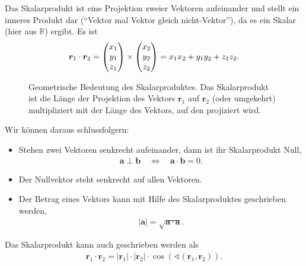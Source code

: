 Das Skalarprodukt ist eine Projektion zweier Vektoren aufeinander und stellt ein inneres Produkt dar (``Vektor mal Vektor gleich nicht-Vektor''), da es ein Skalar (hier aus $\mathbb{R}$) ergibt. Es ist 
\begin{align}
    \bm{r}_1 \cdot \bm{r}_2 = \mqty(x_1\\y_1\\z_1) \times \mqty(x_2\\y_2\\z_2) = x_1x_2 + y_1y_2+z_1z_2.
\end{align}
\begin{figure}[htp]
    \centering
    \caption{Geometrische Bedeutung des Skalarproduktes. Das Skalarprodukt ist die Länge der Projektion des Vektors $\bm{r}_1$ auf $\bm{r}_2$ (oder umgekehrt) multipliziert mit der Länge des Vektors, auf den projiziert wird.}
\end{figure}
Wir können daraus schlussfolgern: 
\begin{itemize}
    \item Stehen zwei Vektoren senkrecht aufeinander, dann ist ihr Skalarprodukt Null, 
    \begin{align}
        \bm{a} \perp \bm{b} \quad \Longleftrightarrow \quad \bm{a}\cdot \bm{b} = 0. 
    \end{align}
    \item Der Nullvektor steht senkrecht auf allen Vektoren. 
    \item Der Betrag eines Vektors kann mit Hilfe des Skalarproduktes geschrieben werden, 
    \begin{align}
        |\bm{a}| = \sqrt{\bm{a}\cdot\bm{a}}.
    \end{align}
\end{itemize}
Das Skalarprodukt kann auch geschrieben werden als 
\begin{align}
    \bm{r}_1 \cdot \bm{r}_2 = |\bm{r}_1|\cdot|\bm{r}_2| \cdot \cos(\sphericalangle (\bm{r}_1,\bm{r}_2)). 
\end{align}

